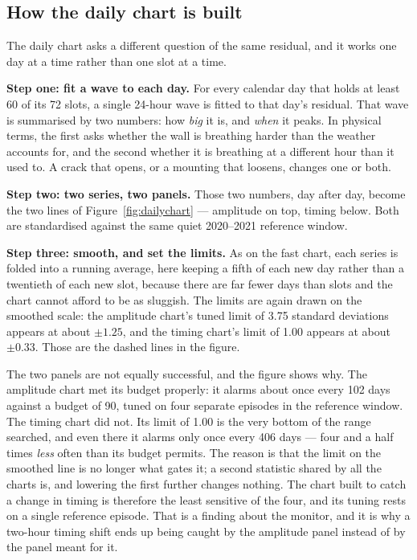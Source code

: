 \documentclass[11pt,a4paper]{article}
\begin{document}
\subsection*{How the daily chart is built}

The daily chart asks a different question of the same residual, and it works one
day at a time rather than one slot at a time.

\textbf{Step one: fit a wave to each day.} For every calendar day that holds at
least 60 of its 72 slots, a single 24-hour wave is fitted to that day's residual.
That wave is summarised by two numbers: how \emph{big} it is, and \emph{when} it
peaks. In physical terms, the first asks whether the wall is breathing harder
than the weather accounts for, and the second whether it is breathing at a
different hour than it used to. A crack that opens, or a mounting that loosens,
changes one or both.

\textbf{Step two: two series, two panels.} Those two numbers, day after day,
become the two lines of Figure~\ref{fig:dailychart} --- amplitude on top, timing
below. Both are standardised against the same quiet 2020--2021 reference window.

\textbf{Step three: smooth, and set the limits.} As on the fast chart, each
series is folded into a running average, here keeping a fifth of each new day
rather than a twentieth of each new slot, because there are far fewer days than
slots and the chart cannot afford to be as sluggish. The limits are again drawn
on the smoothed scale: the amplitude chart's tuned limit of 3.75 standard
deviations appears at about $\pm 1.25$, and the timing chart's limit of 1.00
appears at about $\pm 0.33$. Those are the dashed lines in the figure.

The two panels are not equally successful, and the figure shows why. The
amplitude chart met its budget properly: it alarms about once every 102 days
against a budget of 90, tuned on four separate episodes in the reference window.
The timing chart did not. Its limit of 1.00 is the very bottom of the range
searched, and even there it alarms only once every 406 days --- four and a half
times \emph{less} often than its budget permits. The reason is that the limit on
the smoothed line is no longer what gates it; a second statistic shared by all
the charts is, and lowering the first further changes nothing. The chart built to
catch a change in timing is therefore the least sensitive of the four, and its
tuning rests on a single reference episode. That is a finding about the monitor,
and it is why a two-hour timing shift ends up being caught by the amplitude
panel instead of by the panel meant for it.
\end{document}
